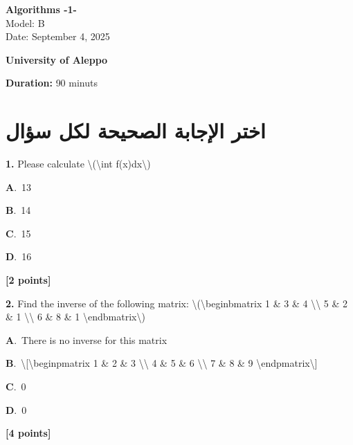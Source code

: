 \documentclass[12pt]{article}
\newcommand{\choice}[3]{%
  \noindent\textbf{#1}.~#2\hfill#3\par\vspace{0.25em}
}
\begin{document}
\begin{flushright}
{\Large \textbf{{\textenglish{Algorithms -1-}}}}\\[0.25em]
{\normalsize \textenglish{Model: }{\textenglish{B}}}\\[0.1em]
{\normalsize \textenglish{Date: }{\textenglish{September 4, 2025}}}
\end{flushright}

\vspace{0.6cm}

\noindent
\begin{minipage}[t]{0.65\textwidth}
  \raggedright
  \textbf{{\textenglish{University of Aleppo}}}\\[0.3em]
\end{minipage}\hfill
\begin{minipage}[t]{0.3\textwidth}
  \raggedleft
  \textenglish{\textbf{Duration: }}{\textenglish{90 minuts}}
\end{minipage}

\vspace{0.9cm}

\section*{اختر الإجابة الصحيحة لكل سؤال}

\noindent \textbf{\textenglish{1.}} {\textenglish{Please calculate \textbackslash{}(\textbackslash{}int f(x)dx\textbackslash{})}}

\noindent\choice{A}{{\textenglish{13}}}{}
\noindent\choice{B}{{\textenglish{14}}}{}
\noindent\choice{C}{{\textenglish{15}}}{}
\noindent\choice{D}{{\textenglish{16}}}{}
\hfill \textbf{[2 points]}\vspace{0.5em}

\noindent \textbf{\textenglish{2.}} {\textenglish{Find the inverse of the following matrix: \textbackslash{}(\textbackslash{}begin{bmatrix} 1 \& 3 \& 4 \textbackslash{}\textbackslash{} 5 \& 2 \& 1 \textbackslash{}\textbackslash{} 6 \& 8 \& 1 \textbackslash{}end{bmatrix}\textbackslash{})}}

\noindent\choice{A}{{\textenglish{There is no inverse for this matrix}}}{}
\noindent\choice{B}{{\textenglish{\textbackslash{}[\textbackslash{}begin{pmatrix} 1 \& 2 \& 3 \textbackslash{}\textbackslash{} 4 \& 5 \& 6 \textbackslash{}\textbackslash{} 7 \& 8 \& 9  \textbackslash{}end{pmatrix}\textbackslash{}]}}}{}
\noindent\choice{C}{{\textenglish{0}}}{}
\noindent\choice{D}{{\textenglish{0}}}{}
\hfill \textbf{[4 points]}\vspace{0.5em}
\end{document}
